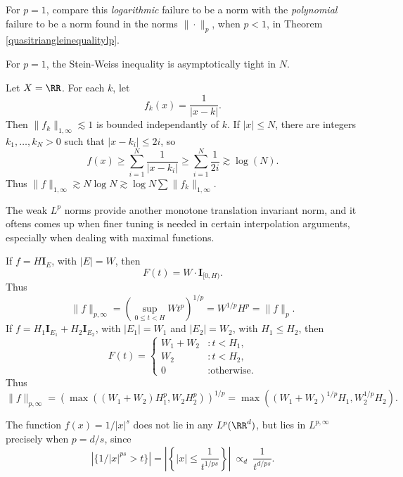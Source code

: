 \begin{remark}
  For $p = 1$, compare this \emph{logarithmic} failure to be a norm with the \emph{polynomial} failure to be a norm found in the norms $\| \cdot \|_p$, when $p < 1$, in Theorem \ref{quasitriangleinequalitylp}.
\end{remark}

For $p = 1$, the Stein-Weiss inequality is asymptotically tight in $N$.

\begin{example}
  Let $X = \RR$. For each $k$, let
  \[ f_k(x) = \frac{1}{|x - k|}. \]
  Then $\| f_k \|_{1,\infty} \lesssim 1$ is bounded independantly of $k$. If $|x| \leq N$, there are integers $k_1, \dots, k_N > 0$ such that $|x - k_i| \leq 2i$, so
  \[ f(x) \geq \sum_{i = 1}^N \frac{1}{|x - k_i|} \geq \sum_{i = 1}^N \frac{1}{2i} \gtrsim \log(N). \]
  Thus $\| f \|_{1,\infty} \gtrsim N \log N \gtrsim \log N \sum \| f_k \|_{1,\infty}$.
\end{example}

The weak $L^p$ norms provide another monotone translation invariant norm, and it oftens comes up when finer tuning is needed in certain interpolation arguments, especially when dealing with maximal functions.

\begin{example}
  If $f = H \mathbf{I}_E$, with $|E| = W$, then
  \[ F(t) = W \cdot \mathbf{I}_{[0,H)}. \]
  Thus
  \[ \| f \|_{p,\infty} = \left( \sup_{0 \leq t < H} W t^p \right)^{1/p} = W^{1/p} H^p = \| f \|_p. \]
  If $f = H_1 \mathbf{I}_{E_1} + H_2 \mathbf{I}_{E_2}$, with $|E_1| = W_1$ and $|E_2| = W_2$, with $H_1 \leq H_2$, then
  \[ F(t) = \begin{cases} W_1 + W_2 &: t < H_1, \\ W_2 &: t < H_2, \\ 0 &: \text{otherwise.} \end{cases} \]
  Thus
  \[ \| f \|_{p,\infty} = \left( \max((W_1 + W_2) H_1^p, W_2 H_2^p) \right)^{1/p} = \max((W_1 + W_2)^{1/p} H_1, W_2^{1/p} H_2). \]
\end{example}

\begin{example}
    The function $f(x) = 1/|x|^s$ does not lie in any $L^p(\RR^d)$, but lies in $L^{p,\infty}$ precisely when $p = d/s$, since
    \[ \left| \{ 1/|x|^{ps} > t \} \right| = \left| \left\{ |x| \leq \frac{1}{t^{1/ps}} \right\} \right|\ \propto_d\ \frac{1}{t^{d/ps}}. \]
\end{example}

